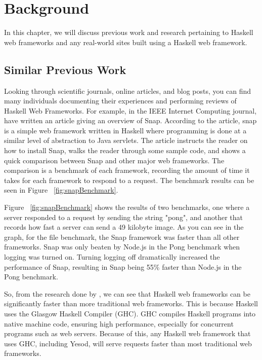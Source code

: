 \chapter{Background}
\label{chap:Background}

In this chapter, we will discuss previous work and research pertaining
to Haskell web frameworks and any real-world sites built using a Haskell
web framework.

\section{Similar Previous Work}

Looking through scientific journals, online articles, and blog posts,
you can find many individuals documenting their experiences and performing
reviews of Haskell Web Frameworks. For example, in the IEEE Internet Computing
journal, \citeauthor{snapFramework} have written an article giving an overview
of Snap. According to the article, snap is a simple web framework written
in Haskell where programming is done at a similar level of abstraction
to Java servlets. The article instructs the reader on how to install Snap, 
walks the reader through some sample code, and shows a quick comparison
between Snap and other major web frameworks. The comparison is a benchmark
of each framework, recording the amount of time it takes for each framework
to respond to a request. The benchmark results can be seen in Figure 
~\ref{fig:snapBenchmark}. \parencite{snapFramework}

Figure ~\ref{fig:snapBenchmark} shows the results of two benchmarks, one where a server
responded to a request by sending the string "pong", and another that records how fast
a server can send a 49 kilobyte image. As you can see in the
graph, for the file benchmark, the Snap framework was faster than all other frameworks.
Snap was only beaten by Node.js in the Pong benchmark when logging was turned on.
Turning logging off dramatically increased the performance of Snap, resulting in
Snap being 55\% faster than Node.js in the Pong benchmark. \parencite{snapFramework}

So, from the research done by \citeauthor{snapFramework}, we can see that Haskell
web frameworks can be significantly faster than more traditional web frameworks.
This is because Haskell uses the Glasgow Haskell Compiler (GHC). GHC compiles
Haskell programs into native machine code, ensuring high performance, especially
for concurrent programs such as web servers. Because of this, any Haskell web framework
that uses GHC, including Yesod, will serve requests faster than most traditional
web frameworks. \parencite{ghcSite}

